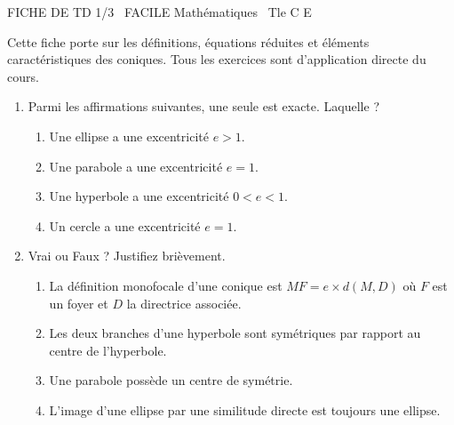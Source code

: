 \documentclass[11pt]{article}
\begin{document}
\begin{tcolorbox}[enhanced,colback=popink,colframe=popink,arc=10pt,boxrule=0pt,left=12pt,right=12pt,top=9pt,bottom=9pt]
{\color{white}\popxbold\small FICHE DE TD 1/3 \textbullet\ FACILE \hfill Mathématiques \textbullet\ Tle C E\par}
\end{tcolorbox}
\vspace{4pt}
Cette fiche porte sur les définitions, équations réduites et éléments caractéristiques des coniques. Tous les exercices sont d'application directe du cours.

\begin{exercice}
\begin{enumerate}
    \item Parmi les affirmations suivantes, une seule est exacte. Laquelle ?
    \begin{enumerate}
        \item Une ellipse a une excentricité $e > 1$.
        \item Une parabole a une excentricité $e = 1$.
        \item Une hyperbole a une excentricité $0 < e < 1$.
        \item Un cercle a une excentricité $e = 1$.
    \end{enumerate}
    \item Vrai ou Faux ? Justifiez brièvement.
    \begin{enumerate}
        \item La définition monofocale d'une conique est $MF = e \times d(M, D)$ où $F$ est un foyer et $D$ la directrice associée.
        \item Les deux branches d'une hyperbole sont symétriques par rapport au centre de l'hyperbole.
        \item Une parabole possède un centre de symétrie.
        \item L'image d'une ellipse par une similitude directe est toujours une ellipse.
    \end{enumerate}
\end{enumerate}
\end{exercice}
\end{document}
